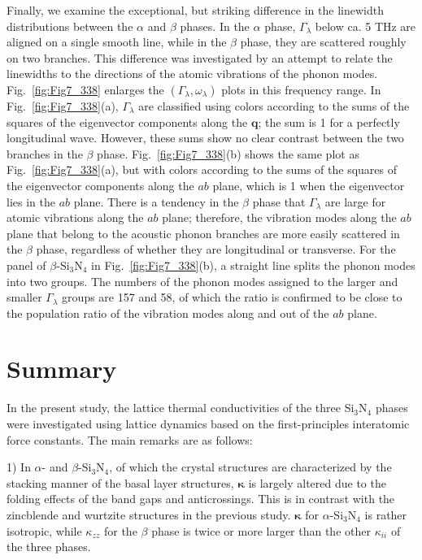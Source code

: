 \documentclass[twocolumn,amsmath,amssymb,a4paper,prb,superscriptaddress,floatfix]{revtex4-1}
\begin{document}
Finally, we examine the exceptional, but striking difference in the linewidth
distributions between the $\alpha$ and $\beta$ phases. In the $\alpha$ phase,
$\Gamma_\lambda$ below ca. 5 THz are aligned on a single smooth line, while in
the $\beta$ phase, they are scattered roughly on two branches. This difference
was investigated by an attempt to relate the linewidths to the directions of the
atomic vibrations of the phonon modes. Fig.~\ref{fig:Fig7_338} enlarges the
$(\Gamma_\lambda,\omega_\lambda)$ plots in this frequency range. In
Fig.~\ref{fig:Fig7_338}(a), $\Gamma_\lambda$ are classified using colors
according to the sums of the squares of the eigenvector components along the
$\mathbf{q}$; the sum is 1 for a perfectly longitudinal wave. However, these
sums show no clear contrast between the two branches in the $\beta$ phase.
Fig.~\ref{fig:Fig7_338}(b) shows the same plot as Fig.~\ref{fig:Fig7_338}(a),
but with colors according to the sums of the squares of the eigenvector
components along the $ab$ plane, which is 1 when the eigenvector lies in the
$ab$ plane.  There is a tendency in the $\beta$ phase that $\Gamma_\lambda$ are
large for atomic vibrations along the $ab$ plane; therefore, the vibration modes
along the $ab$ plane that belong to the acoustic phonon branches are more easily
scattered in the $\beta$ phase, regardless of whether they are longitudinal or
transverse. For the panel of $\beta$-Si$_3$N$_4$ in Fig.~\ref{fig:Fig7_338}(b),
a straight line splits the phonon modes into two groups. The numbers of the
phonon modes assigned to the larger and smaller $\Gamma_\lambda$ groups are 157
and 58, of which the ratio is confirmed to be close to the population ratio of
the vibration modes along and out of the $ab$ plane.


\section{Summary}

In the present study, the lattice thermal conductivities of the
three Si$_3$N$_4$ phases were investigated using lattice dynamics based on the
first-principles interatomic force constants. The main remarks are as follows:

1) In $\alpha$- and $\beta$-Si$_3$N$_4$, of which the crystal structures are
characterized by the stacking manner of the basal layer structures,
$\boldsymbol{\kappa}$ is largely altered due to the folding effects of the band
gaps and anticrossings. This is in contrast with the zincblende and wurtzite
structures in the previous study\cite{phono3py}.  $\boldsymbol{\kappa}$ for
$\alpha$-Si$_3$N$_4$ is rather isotropic, while $\kappa$$_{zz}$ for the $\beta$
phase is twice or more larger than the other $\kappa_{ii}$ of the three phases.
\end{document}
